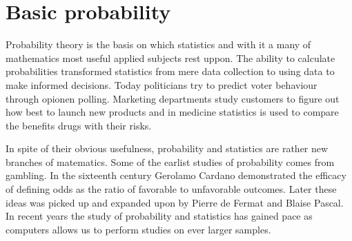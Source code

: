 \chapter{Basic probability}


Probability theory is the basis on which statistics and with it a many of mathematics most useful applied subjects rest uppon. The ability to calculate probabilities transformed statistics from mere data collection to using data to make informed decisions. Today politicians try to predict voter behaviour through opionen polling. Marketing departments study customers to figure out how best to launch new products and in medicine statistics is used to compare the benefits drugs with their risks.

\myindent In spite of their obvious usefulness, probability and statistics are rather new branches of matematics. Some of the earlist studies of probability comes from gambling. In the sixteenth century Gerolamo Cardano demonstrated the efficacy of defining odds as the ratio of favorable to unfavorable outcomes. Later these ideas was picked up and expanded upon by Pierre de Fermat and Blaise Pascal. In recent years the study of probability and statistics has gained pace as computers allows us to perform studies on ever larger samples.

